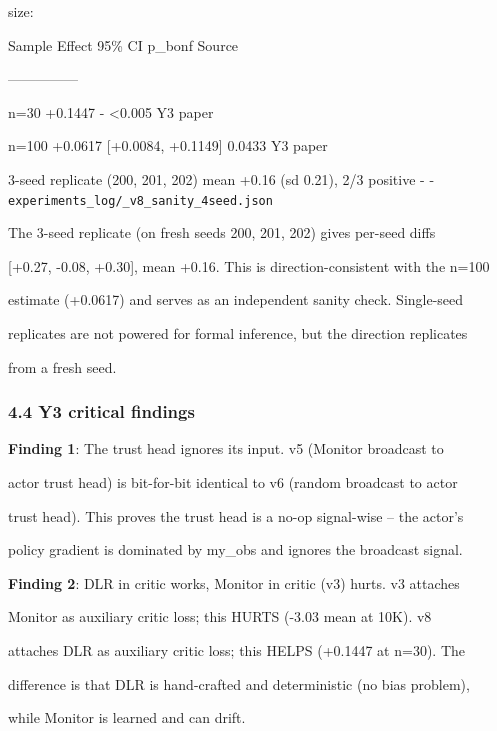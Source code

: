\documentclass[
]{article}
\begin{document}
size:

Sample \textbar{} Effect \textbar{} 95\% CI \textbar{} p\_bonf
\textbar{} Source \textbar{}

\textbar---\textbar---\textbar---\textbar---\textbar---\textbar{}

n=30 \textbar{} +0.1447 \textbar{} - \textbar{} \textless0.005
\textbar{} Y3 paper \textbar{}

n=100 \textbar{} +0.0617 \textbar{} {[}+0.0084, +0.1149{]} \textbar{}
0.0433 \textbar{} Y3 paper \textbar{}

3-seed replicate (200, 201, 202) \textbar{} mean +0.16 (sd 0.21), 2/3
positive \textbar{} - \textbar{} - \textbar{}
\texttt{experiments\_log/\_v8\_sanity\_4seed.json} \textbar{}

The 3-seed replicate (on fresh seeds 200, 201, 202) gives per-seed diffs

{[}+0.27, -0.08, +0.30{]}, mean +0.16. This is direction-consistent with
the n=100

estimate (+0.0617) and serves as an independent sanity check.
Single-seed

replicates are not powered for formal inference, but the direction
replicates

from a fresh seed.

\subsubsection{4.4 Y3 critical findings}\label{y3-critical-findings}

\textbf{Finding 1}: The trust head ignores its input. v5 (Monitor
broadcast to

actor trust head) is bit-for-bit identical to v6 (random broadcast to
actor

trust head). This proves the trust head is a no-op signal-wise -- the
actor's

policy gradient is dominated by my\_obs and ignores the broadcast
signal.

\textbf{Finding 2}: DLR in critic works, Monitor in critic (v3) hurts.
v3 attaches

Monitor as auxiliary critic loss; this HURTS (-3.03 mean at 10K). v8

attaches DLR as auxiliary critic loss; this HELPS (+0.1447 at n=30). The

difference is that DLR is hand-crafted and deterministic (no bias
problem),

while Monitor is learned and can drift.
\end{document}
